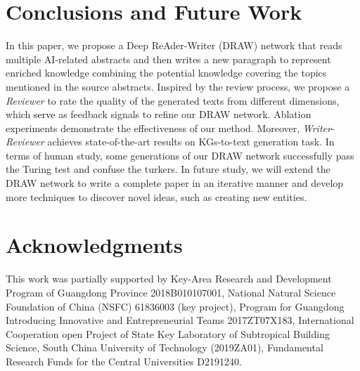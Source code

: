 \documentclass[letterpaper]{article}
\def\hmg{\textcolor{black}}
\begin{document}
\section{Conclusions and Future Work}
In this paper, we propose a Deep ReAder-Writer (DRAW) network that reads multiple AI-related abstracts and then writes a new paragraph to represent enriched knowledge combining the potential knowledge
covering the topics mentioned in the source abstracts. 
Inspired by the review process, we propose a
\textit{Reviewer} to rate the quality of the generated texts from different dimensions, which \hmg{serve} as feedback signals to refine our DRAW network.
Ablation experiments demonstrate the effectiveness of our method. Moreover, \textit{Writer}-\textit{Reviewer} achieves state-of-the-art results on KGs-to-text generation task.
In terms of human study, some generations of our DRAW network successfully pass the Turing test and confuse the turkers. In future study, we will extend the DRAW network to write a complete paper in an iterative manner and develop more techniques to discover novel ideas, such as creating new entities.

\section*{Acknowledgments}
This work was partially supported by 
Key-Area Research and Development Program of Guangdong Province 2018B010107001,
National Natural Science Foundation of China (NSFC) 61836003 (key project),
Program for Guangdong Introducing Innovative and Entrepreneurial Teams 2017ZT07X183,
International Cooperation open Project of State Key Laboratory of Subtropical Building Science, South China University of Technology (2019ZA01),
Fundamental Research Funds for the Central Universities D2191240.
\end{document}
